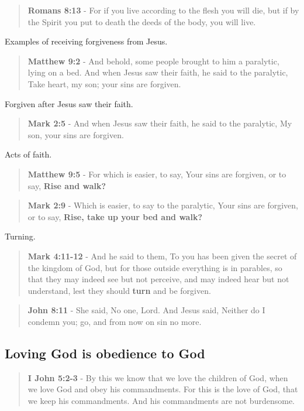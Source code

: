 \documentclass[11pt]{article}
\begin{document}
\begin{quote}
\textbf{Romans 8:13} - For if you live according to the flesh you will die, but if by the Spirit you put to death the deeds of the body, you will live.
\end{quote}

Examples of receiving forgiveness from Jesus.

\begin{quote}
\textbf{Matthew 9:2} - And behold, some people brought to him a paralytic, lying on a bed. And when Jesus saw their faith, he said to the paralytic, Take heart, my son; your sins are forgiven.
\end{quote}

Forgiven after Jesus saw their faith.

\begin{quote}
\textbf{Mark 2:5} - And when Jesus saw their faith, he said to the paralytic, My son, your sins are forgiven.
\end{quote}

Acts of faith.

\begin{quote}
\textbf{Matthew 9:5} - For which is easier, to say, Your sins are forgiven, or to say, \textbf{Rise and walk?}
\end{quote}

\begin{quote}
\textbf{Mark 2:9} - Which is easier, to say to the paralytic, Your sins are forgiven, or to say, \textbf{Rise, take up your bed and walk?}
\end{quote}

Turning.

\begin{quote}
\textbf{Mark 4:11-12} - And he said to them, To you has been given the secret of the kingdom of God, but for those outside everything is in parables, so that they may indeed see but not perceive, and may indeed hear but not understand, lest they should \textbf{turn} and be forgiven.
\end{quote}

\begin{quote}
\textbf{John 8:11} - She said, No one, Lord. And Jesus said, Neither do I condemn you; go, and from now on sin no more.
\end{quote}

\subsection{Loving God is obedience to God}
\label{sec:orgb55d0ed}
\begin{quote}
\textbf{I John 5:2-3} - By this we know that we love the children of God, when we love God and obey his commandments. For this is the love of God, that we keep his commandments. And his commandments are not burdensome.
\end{quote}
\end{document}

